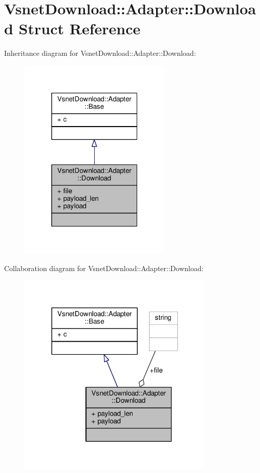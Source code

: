\hypertarget{structVsnetDownload_1_1Adapter_1_1Download}{}\section{Vsnet\+Download\+:\+:Adapter\+:\+:Download Struct Reference}
\label{structVsnetDownload_1_1Adapter_1_1Download}


Inheritance diagram for Vsnet\+Download\+:\+:Adapter\+:\+:Download\+:
\nopagebreak
\begin{figure}[H]
\begin{center}
\leavevmode
\includegraphics[width=205pt]{d6/dad/structVsnetDownload_1_1Adapter_1_1Download__inherit__graph}
\end{center}
\end{figure}


Collaboration diagram for Vsnet\+Download\+:\+:Adapter\+:\+:Download\+:
\nopagebreak
\begin{figure}[H]
\begin{center}
\leavevmode
\includegraphics[width=264pt]{d2/d61/structVsnetDownload_1_1Adapter_1_1Download__coll__graph}
\end{center}
\end{figure}
